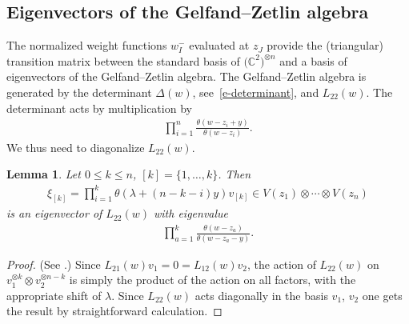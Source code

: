 \documentclass[pdftex]{sigma}
\numberwithin{equation}{section}
\newtheorem{Lemma}[Theorem]{Lemma}
\begin{document}
\subsection{Eigenvectors of the Gelfand--Zetlin algebra}\label{ss-3.10}
The normalized weight functions $w^-_I$ evaluated at $z_J$ provide the (triangular) transition matrix between the standard basis of $\big(\mathbb C^2\big)^{\otimes n}$ and a basis of eigenvectors of the Gelfand--Zetlin
algebra. The Gelfand--Zetlin algebra is generated by the determinant $\Delta(w)$, see~\eqref{e-determinant}, and $L_{22}(w)$. The determinant acts by multiplication by
\begin{gather*}
 \prod_{i=1}^n\frac{\theta(w-z_i+y)}{\theta(w-z_i)}.
\end{gather*}
 We thus need to diagonalize $L_{22}(w)$.
\begin{Lemma}\label{lemma-6} Let $0\leq k\leq n$, $[k]=\{1,\dots,k\}$. Then
 \begin{gather*}
 \xi_{[k]}= \prod_{i=1}^k\theta(\lambda+(n-k-i)y)v_{[k]}\in V(z_1)\otimes\cdots\otimes V(z_n)
 \end{gather*}
 is an eigenvector of $L_{22}(w)$ with eigenvalue
 \begin{gather*}
 \prod_{a=1}^k\frac{\theta(w-z_a)}{\theta(w-z_a-y)}.
 \end{gather*}
\end{Lemma}
\begin{proof} (See \cite{GRTV,RTV2,RV2}.) Since $L_{21}(w)v_1=0=L_{12}(w)v_2$, the action of $L_{22}(w)$ on $v_1^{\otimes k}\otimes v_2^{\otimes n-k}$ is simply the product of the action on all factors, with the appropriate shift of $\lambda$. Since $L_{22}(w)$ acts diagonally in the basis $v_1$, $v_2$ one gets the result by straightforward calculation.
\end{proof}
\end{document}
